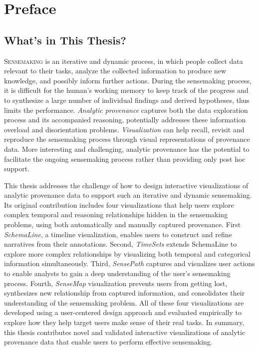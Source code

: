 \chapter*{Preface}

\section*{What's in This Thesis?}
\lettrine{S}{ensemaking} is an iterative and dynamic process, in which people collect data relevant to their tasks, analyze the collected information to produce new knowledge, and possibly inform further actions. During the sensemaking process, it is difficult for the human's working memory to keep track of the progress and to synthesize a large number of individual findings and derived hypotheses, thus limits the performance. \emph{Analytic provenance} captures both the data exploration process and its accompanied reasoning, potentially addresses these information overload and disorientation problems. \emph{Visualization} can help recall, revisit and reproduce the sensemaking process through visual representations of provenance data. More interesting and challenging, analytic provenance has the potential to facilitate the ongoing sensemaking process rather than providing only post hoc support.

This thesis addresses the challenge of how to design interactive visualizations of analytic provenance data to support such an iterative and dynamic sensemaking. Its original contribution includes four visualizations that help users explore complex temporal and reasoning relationships hidden in the sensemaking problems, using both automatically and manually captured provenance. First \emph{SchemaLine}, a timeline visualization, enables users to construct and refine narratives from their annotations. Second, \emph{TimeSets} extends SchemaLine to explore more complex relationships by visualizing both temporal and categorical information simultaneously. Third, \emph{SensePath} captures and visualizes user actions to enable analysts to gain a deep understanding of the user's sensemaking process. Fourth, \emph{SenseMap} visualization prevents users from getting lost, synthesizes new relationship from captured information, and consolidates their understanding of the sensemaking problem. All of these four visualizations are developed using a user-centered design approach and evaluated empirically to explore how they help target users make sense of their real tasks. In summary, this thesis contributes novel and validated interactive visualizations of analytic provenance data that enable users to perform effective sensemaking.


